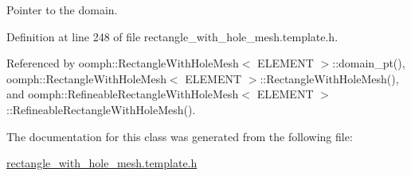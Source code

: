 Pointer to the domain. 



Definition at line 248 of file rectangle\+\_\+with\+\_\+hole\+\_\+mesh.\+template.\+h.



Referenced by oomph\+::\+Rectangle\+With\+Hole\+Mesh$<$ E\+L\+E\+M\+E\+N\+T $>$\+::domain\+\_\+pt(), oomph\+::\+Rectangle\+With\+Hole\+Mesh$<$ E\+L\+E\+M\+E\+N\+T $>$\+::\+Rectangle\+With\+Hole\+Mesh(), and oomph\+::\+Refineable\+Rectangle\+With\+Hole\+Mesh$<$ E\+L\+E\+M\+E\+N\+T $>$\+::\+Refineable\+Rectangle\+With\+Hole\+Mesh().



The documentation for this class was generated from the following file\+:\begin{DoxyCompactItemize}
\item 
\hyperlink{rectangle__with__hole__mesh_8template_8h}{rectangle\+\_\+with\+\_\+hole\+\_\+mesh.\+template.\+h}\end{DoxyCompactItemize}
